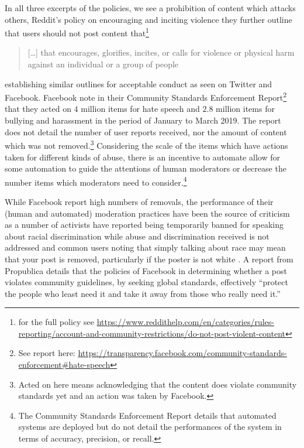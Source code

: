 In all three excerpts of the policies, we see a prohibition of content which attacks others, Reddit's policy on encouraging and inciting violence they further outline that users should not post content that\footnote{for the full policy see \url{https://www.reddithelp.com/en/categories/rules-reporting/account-and-community-restrictions/do-not-post-violent-content}}

\begin{quote}
  [\dots] that encourages, glorifies, incites, or calls for violence or physical harm against an individual or a group of people
\end{quote}

establishing similar outlines for acceptable conduct as seen on Twitter and Facebook. Facebook note in their Community Standards Enforcement Report\footnote{See report here: \url{https://transparency.facebook.com/community-standards-enforcement\#hate-speech}} that they acted on $4$ million items for hate speech and $2.8$ million items for bullying and harassment in the period of January to March 2019. The report does not detail the number of user reports received, nor the amount of content which was not removed.\footnote{Acted on here means acknowledging that the content does violate community standards yet and an action was taken by Facebook.} Considering the scale of the items which have actions taken for different kinds of abuse, there is an incentive to automate allow for some automation to guide the attentions of human moderators or decrease the number items which moderators need to consider.\footnote{The Community Standards Enforcement Report details that automated systems are deployed but do not detail the performances of the system in terms of accuracy, precision, or recall.}

While Facebook report high numbers of removals, the performance of their (human and automated) moderation practices have been the source of criticism as a number of activists have reported being temporarily banned for speaking about racial discrimination while abuse and discrimination received is not addressed \citep{Sharif:2019} and common users noting that simply talking about race may mean that your post is removed, particularly if the poster is not white \citep{Guynn:2019}. A report from Propublica details that the policies of Facebook in determining whether a post violates community guidelines, by seeking global standards, effectively ``protect the people who least need it and take it away from those who really need it.''\citep{Angwin:2017}

